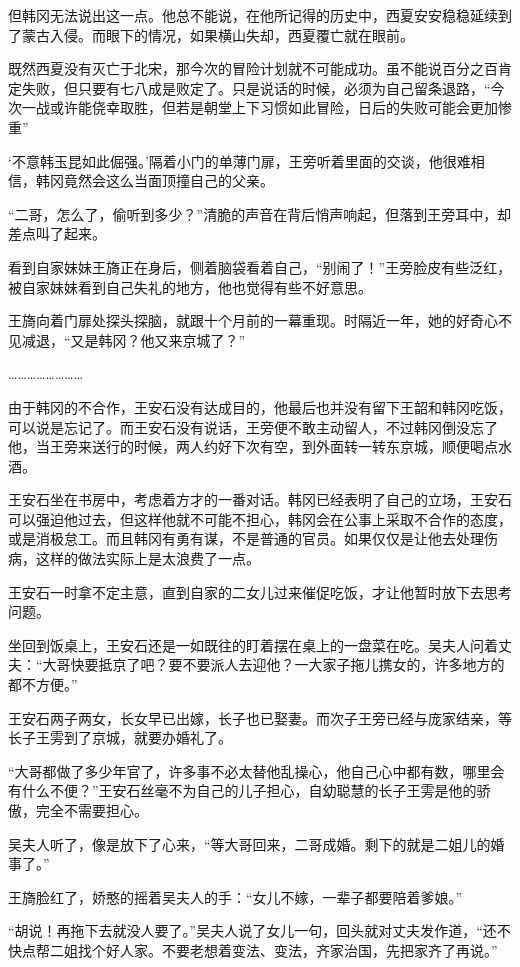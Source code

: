但韩冈无法说出这一点。他总不能说，在他所记得的历史中，西夏安安稳稳延续到了蒙古入侵。而眼下的情况，如果横山失却，西夏覆亡就在眼前。

既然西夏没有灭亡于北宋，那今次的冒险计划就不可能成功。虽不能说百分之百肯定失败，但只要有七八成是败定了。只是说话的时候，必须为自己留条退路，“今次一战或许能侥幸取胜，但若是朝堂上下习惯如此冒险，日后的失败可能会更加惨重”

‘不意韩玉昆如此倔强。’隔着小门的单薄门扉，王旁听着里面的交谈，他很难相信，韩冈竟然会这么当面顶撞自己的父亲。

“二哥，怎么了，偷听到多少？”清脆的声音在背后悄声响起，但落到王旁耳中，却差点叫了起来。

看到自家妹妹王旖正在身后，侧着脑袋看着自己，“别闹了！”王旁脸皮有些泛红，被自家妹妹看到自己失礼的地方，他也觉得有些不好意思。

王旖向着门扉处探头探脑，就跟十个月前的一幕重现。时隔近一年，她的好奇心不见减退，“又是韩冈？他又来京城了？”

……………………

由于韩冈的不合作，王安石没有达成目的，他最后也并没有留下王韶和韩冈吃饭，可以说是忘记了。而王安石没有说话，王旁便不敢主动留人，不过韩冈倒没忘了他，当王旁来送行的时候，两人约好下次有空，到外面转一转东京城，顺便喝点水酒。

王安石坐在书房中，考虑着方才的一番对话。韩冈已经表明了自己的立场，王安石可以强迫他过去，但这样他就不可能不担心，韩冈会在公事上采取不合作的态度，或是消极怠工。而且韩冈有勇有谋，不是普通的官员。如果仅仅是让他去处理伤病，这样的做法实际上是太浪费了一点。

王安石一时拿不定主意，直到自家的二女儿过来催促吃饭，才让他暂时放下去思考问题。

坐回到饭桌上，王安石还是一如既往的盯着摆在桌上的一盘菜在吃。吴夫人问着丈夫：“大哥快要抵京了吧？要不要派人去迎他？一大家子拖儿携女的，许多地方的都不方便。”

王安石两子两女，长女早已出嫁，长子也已娶妻。而次子王旁已经与庞家结亲，等长子王雱到了京城，就要办婚礼了。

“大哥都做了多少年官了，许多事不必太替他乱操心，他自己心中都有数，哪里会有什么不便？”王安石丝毫不为自己的儿子担心，自幼聪慧的长子王雱是他的骄傲，完全不需要担心。

吴夫人听了，像是放下了心来，“等大哥回来，二哥成婚。剩下的就是二姐儿的婚事了。”

王旖脸红了，娇憨的摇着吴夫人的手：“女儿不嫁，一辈子都要陪着爹娘。”

“胡说！再拖下去就没人要了。”吴夫人说了女儿一句，回头就对丈夫发作道，“还不快点帮二姐找个好人家。不要老想着变法、变法，齐家治国，先把家齐了再说。”

